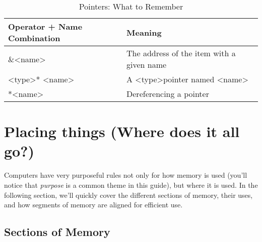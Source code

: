 \documentclass[a4paper, 12pt]{article}
\begin{document}
\begin{flushleft}
	\begin{table}[]
		\centering
		\caption{Pointers: What to Remember}
		\begin{tabular}{|l|l|}
			\hline
			Operator + Name Combination                                  & Meaning                                                                   \\ \hline
			\&\textless{}name\textgreater{}                              & The address of the item with a given name                                 \\ \hline
			\textless{}type\textgreater{}* \textless{}name\textgreater{} & A \textless{}type\textgreater pointer named \textless{}name\textgreater{} \\ \hline
			*\textless{}name\textgreater{}                               & Dereferencing a pointer                                                   \\ \hline
		\end{tabular}
	\end{table}
\end{flushleft}


\newpage


\section{Placing things (Where does it all go?)}

\begin{flushleft}
	Computers have very purposeful rules not only for how memory is used (you'll notice that \textit{purpose} is a common theme in this guide), but where it is used.
	In the following section, we'll quickly cover the different sections of memory, their uses,
	and how segments of memory are aligned for efficient use.
\end{flushleft}

\subsection{Sections of Memory}
\end{document}
